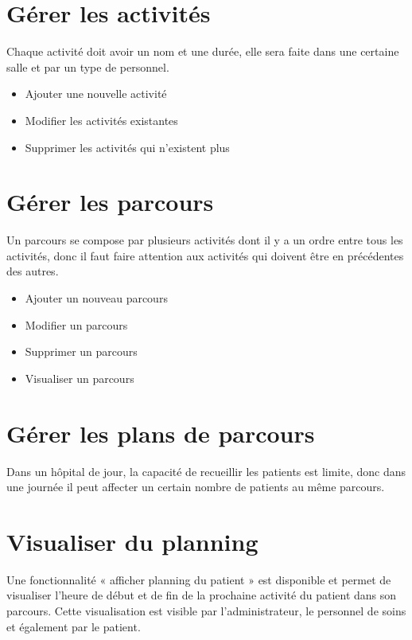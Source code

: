 \documentclass{polytech/polytech}
\begin{document}
\section{Gérer les activités}

Chaque activité doit avoir un nom et une durée, elle sera faite dans une certaine salle et par un type de personnel.

\begin{itemize}
	\item Ajouter une nouvelle activité
	\item Modifier les activités existantes
	\item Supprimer les activités qui n’existent plus
\end{itemize}


\section{Gérer les parcours}

Un parcours se compose par plusieurs activités dont il y a un ordre entre tous les activités, donc il faut faire attention aux activités qui doivent être en précédentes des autres.

\begin{itemize}
	\item Ajouter un nouveau parcours
	\item Modifier un parcours
	\item Supprimer un parcours
	\item Visualiser un parcours
\end{itemize}

\section{Gérer les plans de parcours}

Dans un hôpital de jour, la capacité de recueillir les patients est limite, donc dans une journée il peut affecter un certain nombre de patients au même parcours.

\section{Visualiser du planning}

Une fonctionnalité « afficher planning du patient » est disponible et permet de visualiser l’heure de début et de fin de la prochaine activité du patient dans son parcours. Cette visualisation est visible par l’administrateur, le personnel de soins et également par le patient.
\end{document}
